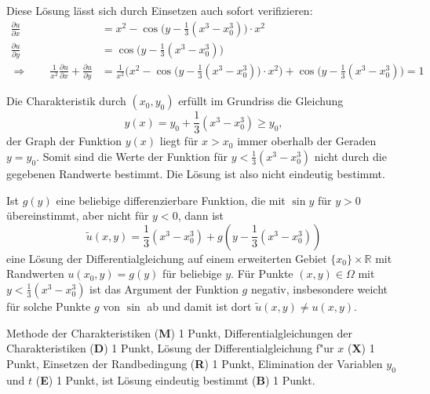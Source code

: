 \begin{loesung}
\begin{teilaufgaben}
\[\]
Diese Lösung lässt sich durch Einsetzen auch sofort verifizieren:
\begin{align*}
\frac{\partial u}{\partial x}
&=
x^2 -
\cos\bigl(y-{\textstyle\frac13}(x^3-x_0^3)\bigr)
\cdot x^2
\\
\frac{\partial u}{\partial y}
&=
\cos\bigl(y-{\textstyle\frac13}(x^3-x_0^3)\bigr)
\\
\Rightarrow
\qquad
\frac1{x^2}
\frac{\partial u}{\partial x}
+
\frac{\partial u}{\partial y}
&=
\frac1{x^2}\biggl(x^2 -
\cos\bigl(y-{\textstyle\frac13}(x^3-x_0^3)\bigr)
\cdot x^2\biggr)
+
\cos\bigl(y-{\textstyle\frac13}(x^3-x_0^3)\bigr)
=1
\end{align*}
\item
Die Charakteristik durch $(x_0,y_0)$ erfüllt im Grundriss die Gleichung
\[
y(x)
=
y_0 + {\textstyle\frac13}(x^3-x_0^3)
\ge
y_0,
\]
der Graph der Funktion $y(x)$ liegt für $x>x_0$ immer oberhalb der
Geraden $y=y_0$.
Somit sind die Werte der Funktion für $y < {\textstyle\frac13}(x^3-x_0^3)$
nicht durch die gegebenen Randwerte bestimmt.
Die Lösung ist also nicht eindeutig bestimmt.
\qedhere
\end{teilaufgaben}
\end{loesung}

\begin{diskussion}
Ist $g(y)$ eine beliebige differenzierbare Funktion, die mit $\sin y$ 
für $y>0$ übereinstimmt, aber nicht für $y<0$, dann ist
\[
\tilde u(x,y) = {\textstyle\frac13}(x^3-x_0^3) + g(y-{\textstyle\frac13}(x^3-x_0^3))
\]
eine Lösung der Differentialgleichung auf einem erweiterten Gebiet
$\{x_0\}\times \mathbb R$ mit Randwerten $u(x_0,y)=g(y)$ für beliebige $y$.
Für Punkte $(x,y)\in\Omega$ mit $y<{\textstyle\frac13}(x^3-x_0^3)$
ist das Argument
der Funktion $g$ negativ, insbesondere weicht für solche Punkte $g$ von
$\sin$ ab und damit ist dort $\tilde u(x,y)\ne u(x,y)$.
\end{diskussion}

\begin{bewertung}
Methode der Charakteristiken ({\bf M}) 1 Punkt,
Differentialgleichungen der Charakteristiken ({\bf D}) 1 Punkt,
Lösung der Differentialgleichung f"ur $x$ ({\bf X}) 1 Punkt,
Einsetzen der Randbedingung ({\bf R}) 1 Punkt,
Elimination der Variablen $y_0$ und $t$ ({\bf E}) 1 Punkt,
ist Lösung eindeutig bestimmt ({\bf B}) 1 Punkt.
\end{bewertung}



